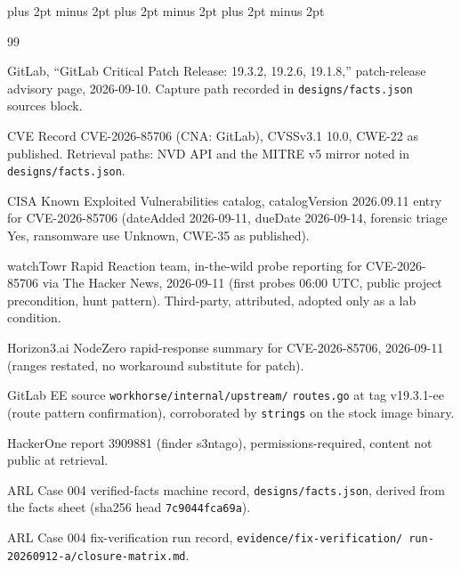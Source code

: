 \documentclass[journal]{IEEEtran}
\begin{document}
\begingroup
\floatsep=4pt plus 2pt minus 2pt
\textfloatsep=4pt plus 2pt minus 2pt
\intextsep=4pt plus 2pt minus 2pt
\begin{thebibliography}{99}
\footnotesize
\setlength{\itemsep}{2pt}
\setlength{\parsep}{0pt}

 GitLab, ``GitLab Critical Patch Release: 19.3.2, 19.2.6,
19.1.8,'' patch-release advisory page, 2026-09-10. Capture path recorded in
\texttt{designs/facts.json} sources block.

 CVE Record CVE-2026-85706 (CNA: GitLab), CVSSv3.1 10.0, CWE-22
as published. Retrieval paths: NVD API and the MITRE v5 mirror noted in
\texttt{designs/facts.json}.

 CISA Known Exploited Vulnerabilities catalog, catalogVersion
2026.09.11 entry for CVE-2026-85706 (dateAdded 2026-09-11, dueDate 2026-09-14,
forensic triage Yes, ransomware use Unknown, CWE-35 as published).

 watchTowr Rapid Reaction team, in-the-wild probe reporting for
CVE-2026-85706 via The Hacker News, 2026-09-11 (first probes 06:00 UTC, public
project precondition, hunt pattern). Third-party, attributed, adopted only as
a lab condition.

 Horizon3.ai NodeZero rapid-response summary for CVE-2026-85706,
2026-09-11 (ranges restated, no workaround substitute for patch).

 GitLab EE source \texttt{workhorse/internal/upstream/}
\texttt{routes.go} at tag v19.3.1-ee (route pattern confirmation), corroborated
by \texttt{strings} on the stock image binary.

 HackerOne report 3909881 (finder s3ntago), permissions-required,
content not public at retrieval.

 ARL Case 004 verified-facts machine record,
\texttt{designs/facts.json}, derived from the facts sheet (sha256 head
\texttt{7c9044fca69a}).

 ARL Case 004 fix-verification run record,
\texttt{evidence/}\hspace{0pt}\texttt{fix-verification/}\
\texttt{run-20260912-a/closure-matrix.md}.

\end{thebibliography}
\endgroup
\end{document}
